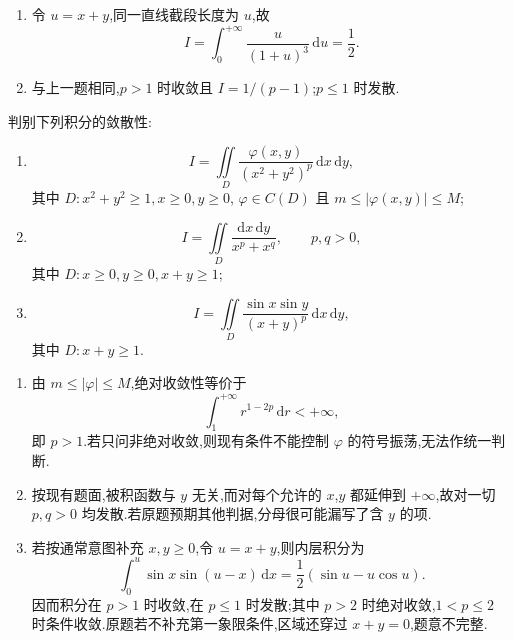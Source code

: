 \begin{solution}
    \leavevmode
    \begin{enumerate}
        \item 令 $u=x+y$,同一直线截段长度为 $u$,故
              \[
                  I=\int_0^{+\infty}\dfrac{u}{(1+u)^3}\,\mathrm{d}u=\dfrac{1}{2}.
              \]
        \item 与上一题相同,$p>1$ 时收敛且 $I=1/(p-1)$;$p\leq1$ 时发散.
    \end{enumerate}
\end{solution}

\begin{example}
    判别下列积分的敛散性:
    \begin{enumerate}
        \item
              \[
                  I=\iint\limits_D\dfrac{\varphi(x,y)}{(x^2+y^2)^p}\,\mathrm{d}x\,\mathrm{d}y,
              \]
              其中 $D:x^2+y^2\geq1,x\geq0,y\geq0$, $\varphi\in C(D)$ 且 $m\leq|\varphi(x,y)|\leq M$;
        \item
              \[
                  I=\iint\limits_D\dfrac{\mathrm{d}x\,\mathrm{d}y}{x^p+x^q},
                  \qquad p,q>0,
              \]
              其中 $D:x\geq0,y\geq0,x+y\geq1$;
        \item
              \[
                  I=\iint\limits_D\dfrac{\sin x\sin y}{(x+y)^p}\,\mathrm{d}x\,\mathrm{d}y,
              \]
              其中 $D:x+y\geq1$.
    \end{enumerate}
\end{example}
\exampleblank

\begin{solution}
    \leavevmode
    \begin{enumerate}
        \item 由 $m\leq|\varphi|\leq M$,绝对收敛性等价于
              \[
                  \displaystyle\int_1^{+\infty}r^{1-2p}\,\mathrm{d}r<+\infty,
              \]
              即 $p>1$.若只问非绝对收敛,则现有条件不能控制 $\varphi$ 的符号振荡,无法作统一判断.
        \item 按现有题面,被积函数与 $y$ 无关,而对每个允许的 $x$,$y$ 都延伸到 $+\infty$,故对一切 $p,q>0$ 均发散.若原题预期其他判据,分母很可能漏写了含 $y$ 的项.
        \item 若按通常意图补充 $x,y\geq0$,令 $u=x+y$,则内层积分为
              \[
                  \displaystyle\int_0^u\sin x\sin(u-x)\,\mathrm{d}x=\dfrac{1}{2}(\sin u-u\cos u).
              \]
              因而积分在 $p>1$ 时收敛,在 $p\leq1$ 时发散;其中 $p>2$ 时绝对收敛,$1<p\leq2$ 时条件收敛.原题若不补充第一象限条件,区域还穿过 $x+y=0$,题意不完整.
    \end{enumerate}
\end{solution}

